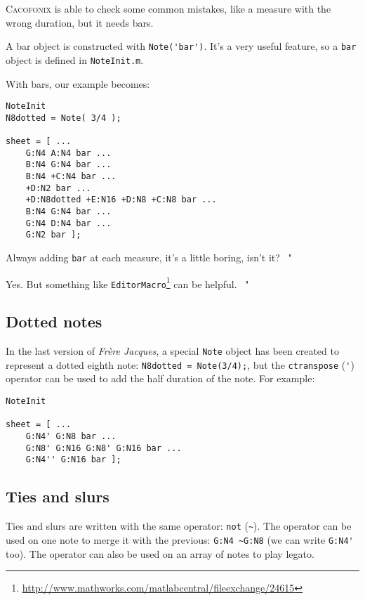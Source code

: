 \documentclass{article}
\newcommand\cacofonix{\textsc{Cacofonix}\xspace}
\newcommand\note{\lstinline!Note!\xspace}
\newcommand\frerejaques{\emph{Fr\`ere Jacques}\xspace}
\newcommand\noteInitFile{\texttt{NoteInit.m}\xspace}
\newcommand\exchange[2]{\texttt{#1}\footnote{\url{#2}}\xspace}
\newenvironment{meenv}{ \par \noindent \makebox[6em][r]{ \textcolor{mecolor}{Me}: " --~}}{~"}
\newenvironment{myselfenv}{ \par \noindent \makebox[6em][r]{ \textcolor{myselfcolor}{Myself}: " --~}}{~"}
\newcommand{ \me }[1]{%
\begin{meenv}%
	#1%
\end{meenv} }
\newcommand{ \myself }[1]{%
\begin{myselfenv}%
	#1%
\end{myselfenv} }
\begin{document}
\cacofonix is able to check some common mistakes, like a measure with the wrong duration, but it needs bars.

A bar object is constructed with \lstinline!Note('bar')!. It's a very useful feature, so a \lstinline!bar! object is defined in \noteInitFile.

With bars, our example becomes:
\begin{lstlisting}
NoteInit
N8dotted = Note( 3/4 );

sheet = [ ...
	G:N4 A:N4 bar ...
	B:N4 G:N4 bar ...
	B:N4 +C:N4 bar ...
	+D:N2 bar ...
	+D:N8dotted +E:N16 +D:N8 +C:N8 bar ...
	B:N4 G:N4 bar ...
	G:N4 D:N4 bar ...
	G:N2 bar ];
\end{lstlisting}

\me{Always adding \lstinline!bar! at each measure, it's a little boring, isn't it?}
\myself{Yes. But something like \exchange{EditorMacro}{http://www.mathworks.com/matlabcentral/fileexchange/24615} can be helpful.}

\subsection{Dotted notes}

In the last version of \frerejaques, a special \note object has been created to represent a dotted eighth note: \lstinline!N8dotted = Note(3/4);!, but the \lstinline!ctranspose! (\lstinline!'!) operator can be used to add the half duration of the note. For example: \\

\begin{lstlisting}
NoteInit

sheet = [ ...
	G:N4' G:N8 bar ...
	G:N8' G:N16 G:N8' G:N16 bar ...
	G:N4'' G:N16 bar ];
\end{lstlisting}

\subsection{Ties and slurs}

Ties and slurs are written with the same operator: \lstinline!not! (\lstinline!~!). The operator can be used on one note to merge it with the previous: \lstinline!G:N4 ~G:N8! (we can write \lstinline!G:N4'! too). The operator can also be used on an array of notes to play legato.
\end{document}
